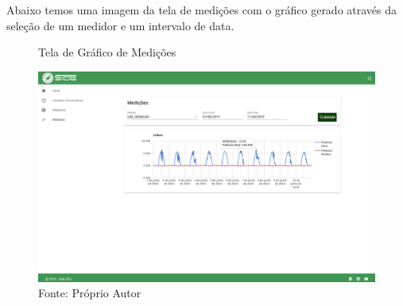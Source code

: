 Abaixo temos uma imagem da tela de medições com o gráfico gerado através da seleção de um medidor e um intervalo de data.

\begin{figure}[H]
    \centering
    \caption{Tela de Gráfico de Medições}
\includegraphics[width=\linewidth]{imagens/side/side-medicoes.png}
    \caption*{Fonte: Próprio Autor}
    \label{fig:side-medicoes}
\end{figure}